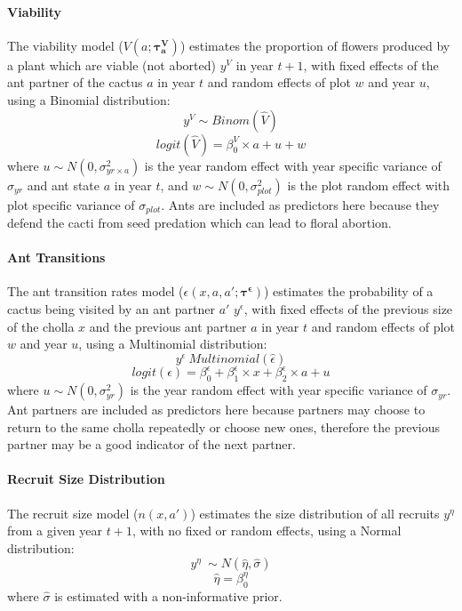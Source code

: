 \documentclass[11pt]{article}
\begin{document}
\paragraph{Viability}
The viability model ($V(a;\pmb{\tau^{V}_{a}})$) estimates the proportion of flowers produced by a plant which are viable (not aborted) $y^V$ in year $t+1$, with fixed effects of the ant partner of the cactus $a$ in year $t$ and random effects of plot $w$ and year $u$, using a Binomial distribution:
$$y^{V} \sim Binom(\hat{V})$$
$$logit(\hat{V}) = \beta_{0}^{V} \times a + u + w$$
where $u \sim N(0,\sigma_{yr \times a}^{2})$ is the year random effect with year specific variance of $\sigma_{yr}$ and ant state $a$ in year $t$, and $w \sim N(0,\sigma_{plot}^{2})$ is the plot random effect with plot specific variance of $\sigma_{plot}$.
Ants are included as predictors here because they defend the cacti from seed predation which can lead to floral abortion. 

\paragraph{Ant Transitions}
The ant transition rates model ($\epsilon(x,a,a';\pmb{\tau^{\epsilon}})$) estimates the probability of a cactus being visited by an ant partner $a'$ $y^{\epsilon}$, with fixed effects of the previous size of the cholla $x$  and the previous ant partner $a$  in year $t$ and random effects of plot $w$ and year $u$, using a Multinomial distribution: 
$$y^{\epsilon} ~ Multinomial(\hat{\epsilon})$$
$$logit(\epsilon) = \beta_{0}^{\epsilon} + \beta_{1}^{\epsilon} \times x + \beta_{2}^{\epsilon} \times a + u$$
where $u \sim N(0,\sigma_{yr}^{2})$ is the year random effect with year specific variance of $\sigma_{yr}$.
Ant partners are included as predictors here because partners may choose to return to the same cholla repeatedly or choose new ones, therefore the previous partner may be a good indicator of the next partner. 

\paragraph{Recruit Size Distribution}
The recruit size model ($n(x,a')$) estimates the size distribution of all recruits $y^{\eta}$ from a given year $t+1$, with no fixed or random effects, using a Normal distribution: 
$$y^{\eta} ~\sim N(\hat{\eta},\hat{\sigma})$$
$$\hat{\eta} = \beta_{0}^{\eta}$$
where $\hat{\sigma}$ is estimated with a non-informative prior. 
\end{document}
